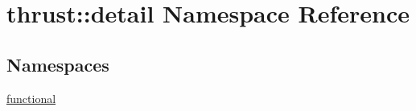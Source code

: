\hypertarget{namespacethrust_1_1detail}{}\section{thrust\+:\+:detail Namespace Reference}
\label{namespacethrust_1_1detail}
\subsection*{Namespaces}
\begin{DoxyCompactItemize}
\item 
 \hyperlink{namespacethrust_1_1detail_1_1functional}{functional}
\end{DoxyCompactItemize}
